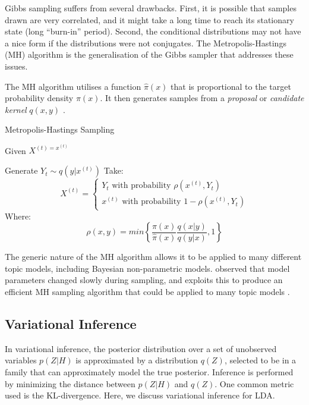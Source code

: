 \documentclass[letterpaper]{article}
\begin{document}
Gibbs sampling suffers from several drawbacks. First, it is possible
that samples drawn are very correlated, and it might take a long time
to reach its stationary state (long ``burn-in'' period). Second, the
conditional distributions may not have a nice form if the
distributions were not conjugates. The Metropolis-Hastings (MH)
algorithm is the generalisation of the Gibbs
sampler that addresses these issues.

The MH algorithm utilises a function $\hat{\pi}(x)$ that is
proportional to the target probability density $\pi(x)$. It then
generates samples from a
\textit{proposal} or \textit{candidate kernel} $q(x, y)$
\cite{chib1995understanding}.

\begin{algorithm}
  \caption{Metropolis-Hastings Sampling}\label{alg:mh}
  \begin{algorithmic}[1]
    \State Given $X^{(t) = x^{(t)}}$
   
    \State Generate $Y_t \sim q(y | x^{(t)})$
    \State Take:
    \begin{equation*}
      X^{(t)} = 
      \begin{cases}
        Y_t \text{ with probability } \rho\left(x^{(t)}, Y_t  \right) \\
        x^{(t)} \text{ with probability } 1 - \rho\left(x^{(t)}, Y_t  \right)
      \end{cases}
    \end{equation*}
    Where:
    \begin{equation*}
      \rho(x,y) = min\left\{ \frac{\pi(x)}{\hat{\pi}(x)} \frac{q(x |
        y)}{q(y|x)}, 1 \right\}
    \end{equation*}
\end{algorithmic}
\end{algorithm}

The generic nature of the MH algorithm allows it to be applied to many
different topic models, including Bayesian non-parametric models.
\citeauthor{li2014reducing} observed that model parameters changed
slowly during sampling, and exploits this to produce an efficient MH
sampling algorithm that could be applied to many topic models
\cite{li2014reducing}.

\subsection{Variational Inference}
\label{subsec:vi}
In variational inference, the posterior distribution over a set of
unobserved variables $p(Z|H)$ is approximated by a distribution
$q(Z)$, selected to be in a family that can approximately model the
true posterior. Inference is performed by minimizing the distance
between $p(Z|H)$ and $q(Z)$. One common metric used is the
KL-divergence. Here, we discuss variational inference for LDA.
\end{document}
